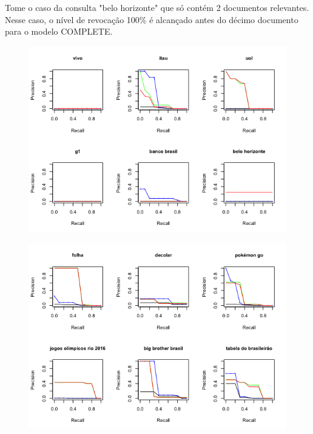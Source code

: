 \documentclass{article}
\begin{document}
Tome o caso da consulta "belo horizonte" que só contém 2 documentos relevantes. Nesse caso, o nível de revocação 100\% é alcançado antes
do décimo documento para o modelo COMPLETE.

\begin{figure}
\centering
\includegraphics[width=\linewidth]{queries_01_to_06.png}
\end{figure}

\begin{figure}
\centering
\includegraphics[width=\linewidth]{queries_07_to_12.png}
\end{figure}
\end{document}
